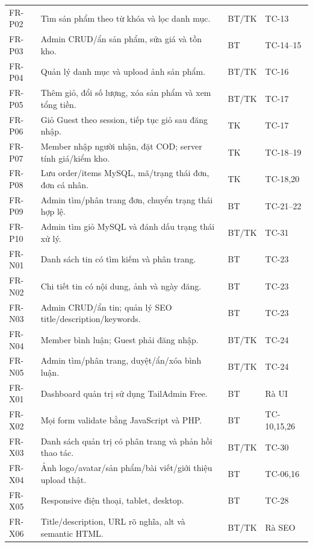 {\begin{longtable}{@{}P{1.8cm}P{9.6cm}P{1.3cm}P{1.8cm}@{}}
FR-P02 & Tìm sản phẩm theo từ khóa và lọc danh mục. & BT/TK & TC-13\\
FR-P03 & Admin CRUD/ẩn sản phẩm, sửa giá và tồn kho. & BT & TC-14–15\\
FR-P04 & Quản lý danh mục và upload ảnh sản phẩm. & BT/TK & TC-16\\
FR-P05 & Thêm giỏ, đổi số lượng, xóa sản phẩm và xem tổng tiền. & BT/TK & TC-17\\
FR-P06 & Giỏ Guest theo session, tiếp tục giỏ sau đăng nhập. & TK & TC-17\\
FR-P07 & Member nhập người nhận, đặt COD; server tính giá/kiểm kho. & TK & TC-18–19\\
FR-P08 & Lưu order/items MySQL, mã/trạng thái đơn, đơn cá nhân. & TK & TC-18,20\\
FR-P09 & Admin tìm/phân trang đơn, chuyển trạng thái hợp lệ. & BT & TC-21–22\\
FR-P10 & Admin tìm giỏ MySQL và đánh dấu trạng thái xử lý. & BT/TK & TC-31\\
FR-N01 & Danh sách tin có tìm kiếm và phân trang. & BT & TC-23\\
FR-N02 & Chi tiết tin có nội dung, ảnh và ngày đăng. & BT & TC-23\\
FR-N03 & Admin CRUD/ẩn tin; quản lý SEO title/description/keywords. & BT & TC-23\\
FR-N04 & Member bình luận; Guest phải đăng nhập. & BT/TK & TC-24\\
FR-N05 & Admin tìm/phân trang, duyệt/ẩn/xóa bình luận. & BT/TK & TC-24\\
FR-X01 & Dashboard quản trị sử dụng TailAdmin Free. & BT & Rà UI\\
FR-X02 & Mọi form validate bằng JavaScript và PHP. & BT & TC-10,15,26\\
FR-X03 & Danh sách quản trị có phân trang và phản hồi thao tác. & BT/TK & TC-30\\
FR-X04 & Ảnh logo/avatar/sản phẩm/bài viết/giới thiệu upload thật. & BT & TC-06,16\\
FR-X05 & Responsive điện thoại, tablet, desktop. & BT & TC-28\\
FR-X06 & Title/description, URL rõ nghĩa, alt và semantic HTML. & BT/TK & Rà SEO\\
\bottomrule\end{longtable}
}
